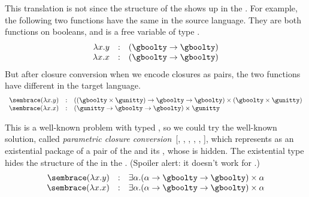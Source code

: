 This translation is not  since the structure of the
 shows up in the .
For example, the following two functions have the same  in the
source language.
They are both functions on booleans, and  is a free variable of type \im{\gboolty}.
\begin{displaymath}
  \begin{array}{rcl}
  \lambda x.y &:&  (\gboolty \to \gboolty)
  \\
  \lambda x.x &:&  (\gboolty \to \gboolty)
  \end{array}
\end{displaymath}
But after closure conversion when we encode closures as pairs, the two
functions have different  in the target language.
%
\begin{displaymath}
  \begin{array}{rcl}
  \cctrans{(\lambda x.y)} &:&  ((\gboolty \times \gunitty) \to \gboolty \to \gboolty)  \times (\gboolty \times \gunitty)
  \\
  \cctrans{(\lambda x.x)} &:&  (\gunitty \to \gboolty \to \gboolty) \times \gunitty
  \end{array}
\end{displaymath}

This is a well-known problem with typed , so we could
try the well-known solution, called \emph{parametric closure
  conversion}~[\citealp{minamide1996}, \citealp{morrisett1998:reccc},
  \citealp{morrisett1998:ftotal}, \citealp{ahmed2008}, \citealp{perconti2014},
  \citealp{new2016}], which represents  as an existential package
of a pair of the  and its , whose  is
hidden.
The existential type hides the structure of the  in the
.
(Spoiler alert: it doesn't work for \slang.)
%
\begin{displaymath}
  \begin{array}{rcl}
    \cctrans{(\lambda x.y)} &:& \exists \alpha. (\alpha \to \gboolty \to \gboolty) \times \alpha
    \\
    \cctrans{(\lambda x.x)} &:& \exists \alpha. (\alpha \to \gboolty \to \gboolty) \times \alpha
  \end{array}
\end{displaymath}

